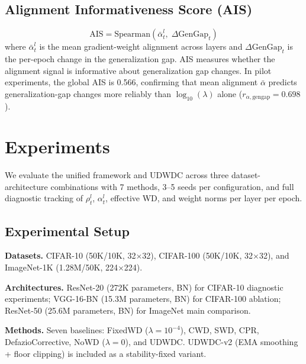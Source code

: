 \documentclass{article}
\begin{document}
\subsection{Alignment Informativeness Score (AIS)}

\begin{equation}
\text{AIS} = \text{Spearman}(\bar\alpha_t^l,\; \Delta\text{GenGap}_t)
\label{eq:ais}
\end{equation}
where $\bar\alpha_t^l$ is the mean gradient-weight alignment across layers and $\Delta\text{GenGap}_t$ is the per-epoch change in the generalization gap. AIS measures whether the alignment signal is informative about generalization gap changes. In pilot experiments, the global AIS is 0.566, confirming that mean alignment $\bar\alpha$ predicts generalization-gap changes more reliably than $\log_{10}(\lambda)$ alone ($r_{\alpha,\text{gengap}} = 0.698$).

\section{Experiments}
\label{sec:experiments}

We evaluate the unified framework and UDWDC across three dataset-architecture combinations with 7 methods, 3--5 seeds per configuration, and full diagnostic tracking of $\rho_t^l$, $\alpha_t^l$, effective WD, and weight norms per layer per epoch.

\subsection{Experimental Setup}

\textbf{Datasets.} CIFAR-10 \citep{krizhevsky2009cifar} (50K/10K, 32$\times$32), CIFAR-100 (50K/10K, 32$\times$32), and ImageNet-1K \citep{deng2009imagenet} (1.28M/50K, 224$\times$224).

\textbf{Architectures.} ResNet-20 \citep{he2016resnet} (272K parameters, BN) for CIFAR-10 diagnostic experiments; VGG-16-BN \citep{simonyan2014vgg} (15.3M parameters, BN) for CIFAR-100 ablation; ResNet-50 (25.6M parameters, BN) for ImageNet main comparison.

\textbf{Methods.} Seven baselines: FixedWD ($\lambda = 10^{-4}$), CWD, SWD, CPR, DefazioCorrective, NoWD ($\lambda = 0$), and UDWDC. UDWDC-v2 (EMA smoothing + floor clipping) is included as a stability-fixed variant.
\end{document}
